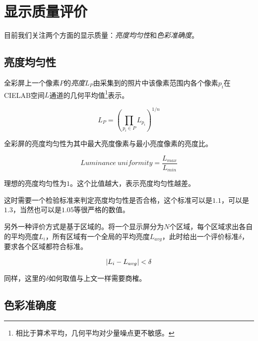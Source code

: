 \section{显示质量评价} %
\label{sec:evaluation}

目前我们关注两个方面的显示质量：\emph{亮度均匀性}和\emph{色彩准确度}。

\subsection{亮度均匀性} %
\label{sub:luminance_uniformity}

\begin{defn}
    全彩屏上一个像素$P$的\emph{亮度}$L_P$由采集到的照片中该像素范围内各个像素$p_i$在CIELAB空间$L$通道的几何平均值\footnote{相比于算术平均，几何平均对少量噪点更不敏感。}表示。

    \begin{equation}
        L_P = \left(\prod_{p_i \in P} L_{p_i} \right)^{1/n}
    \end{equation}
\end{defn}

\begin{defn}
    全彩屏的亮度均匀性为其中最大亮度像素与最小亮度像素的亮度比。

    \begin{equation}
        Luminance\ uniformity = \frac{L_{max}}{L_{min}}
    \end{equation}
\end{defn}

理想的亮度均匀性为$1$。这个比值越大，表示亮度均匀性越差。

这时需要一个检验标准来判定亮度均匀性是否合格，这个标准可以是$1.1$，可以是$1.3$，当然也可以是$1.05$等很严格的数值。

另外一种评价方式是基于区域的。将一个显示屏分为$N$个区域，每个区域求出各自的平均亮度$L_i$，所有区域有一个全局的平均亮度$L_{avg}$，此时给出一个评价标准$\delta$，要求各个区域都符合标准。

\begin{equation}
    \left|L_i - L_{avg}\right| < \delta
\end{equation}

同样，这里的$\delta$如何取值与上文一样需要商榷。


\subsection{色彩准确度} %
\label{sub:color_accuracy}

